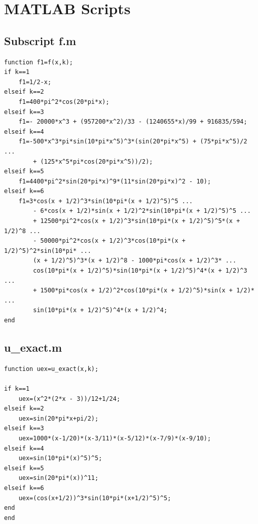 \documentclass[a4paper]{article}
\numberwithin{equation}{section}
\begin{document}
\section{MATLAB Scripts}
\subsection{Subscript f.m}
\begin{verbatim}
function f1=f(x,k);
if k==1
    f1=1/2-x;
elseif k==2
    f1=400*pi^2*cos(20*pi*x);
elseif k==3
    f1=- 20000*x^3 + (957200*x^2)/33 - (1240655*x)/99 + 916835/594;
elseif k==4
    f1=-500*x^3*pi*sin(10*pi*x^5)^3*(sin(20*pi*x^5) + (75*pi*x^5)/2 ...
        + (125*x^5*pi*cos(20*pi*x^5))/2);
elseif k==5
    f1=4400*pi^2*sin(20*pi*x)^9*(11*sin(20*pi*x)^2 - 10);
elseif k==6
    f1=3*cos(x + 1/2)^3*sin(10*pi*(x + 1/2)^5)^5 ...
        - 6*cos(x + 1/2)*sin(x + 1/2)^2*sin(10*pi*(x + 1/2)^5)^5 ...
        + 12500*pi^2*cos(x + 1/2)^3*sin(10*pi*(x + 1/2)^5)^5*(x + 1/2)^8 ...
        - 50000*pi^2*cos(x + 1/2)^3*cos(10*pi*(x + 1/2)^5)^2*sin(10*pi* ...
        (x + 1/2)^5)^3*(x + 1/2)^8 - 1000*pi*cos(x + 1/2)^3* ...
        cos(10*pi*(x + 1/2)^5)*sin(10*pi*(x + 1/2)^5)^4*(x + 1/2)^3 ...
        + 1500*pi*cos(x + 1/2)^2*cos(10*pi*(x + 1/2)^5)*sin(x + 1/2)* ...
        sin(10*pi*(x + 1/2)^5)^4*(x + 1/2)^4;
end
\end{verbatim}
\subsection{u\_exact.m}
\begin{verbatim}
function uex=u_exact(x,k);

if k==1
    uex=(x^2*(2*x - 3))/12+1/24;
elseif k==2
    uex=sin(20*pi*x+pi/2);
elseif k==3
    uex=1000*(x-1/20)*(x-3/11)*(x-5/12)*(x-7/9)*(x-9/10);
elseif k==4
    uex=sin(10*pi*(x)^5)^5;
elseif k==5
    uex=sin(20*pi*(x))^11;
elseif k==6
    uex=(cos(x+1/2))^3*sin(10*pi*(x+1/2)^5)^5;
end
end
\end{verbatim}
\end{document}
